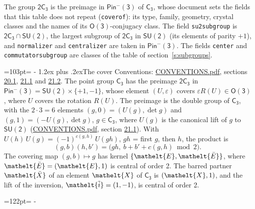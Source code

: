 \documentclass[10pt,a4paper]{article}
\makeatletter
\renewcommand\section{\@startsection{section}{1}{\z@}{-3ex plus -1ex minus -.2ex}%
  {1.2ex plus .2ex}{\normalfont\large\sffamily\bfseries\color{parttitle}}}
\newcommand{\needspace}[1]{\par\penalty-100\begingroup\dimen0=#1\relax\dimen2=\pagegoal
  \advance\dimen2-\pagetotal\ifdim\dimen0>\dimen2\relax\ifdim\dimen2>0pt\vfil\break\fi\fi
  \endgroup}
\numberwithin{equation}{section}
\newcommand{\eltfont}[1]{{\let\sigma\eltsigma\mathelt{#1}}}
\newcommand{\grp}[1]{\mathsf{#1}}
\newcommand{\elt}[1]{\eltfont{#1}}
\newcommand{\dirprod}{\times}
\newcommand{\barred}[1]{\bar{#1}}
\newcommand{\lift}[1]{\tilde{#1}}
\makeatother
\begin{document}
\leavevmode\label{n:element.inversion}\label{n:group.preimage}The group $\grp{2C_{3}}$ is the preimage in $\grp{Pin^{-}(3)}$ of \href{../../../rotation/data/pdf/C3.pdf}{$\grp{C_{3}}$}, whose document sets the fields that this table does not repeat (\texttt{coverof}): its type, family, geometry, crystal classes and the names of its \href{../../../rotation/data/pdf/O3.pdf}{$\grp{O(3)}$}-conjugacy class. The field \texttt{su2subgroup} is $\grp{2C_{3}} \cap \grp{SU(2)}$, the largest subgroup of $\grp{2C_{3}}$ in $\grp{SU(2)}$ (its elements of parity $+1$), and \texttt{normalizer} and \texttt{centralizer} are taken in $\grp{Pin^{-}(3)}$. The fields \texttt{center} and \texttt{commutatorsubgroup} are classes of the table of section~\ref{s:subgroups}.
\needspace{103pt}
\section{The cover}\label{s:cover}
Conventions: \href{../../CONVENTIONS.pdf}{CONVENTIONS.pdf}, sections \href{../../CONVENTIONS.pdf\#conv.20.1}{20.1}, \href{../../CONVENTIONS.pdf\#conv.21.1}{21.1} and \href{../../CONVENTIONS.pdf\#conv.21.2}{21.2}.
\leavevmode\label{n:group.pin.minus}\label{n:group.su2}\label{n:local.pin.sign}\label{n:matrix.covered}\label{n:matrix.lift.su2}\label{n:index.bar}The point group $\grp{C_{3}}$ has the preimage $\grp{2C_{3}}$ in $\grp{Pin^{-}(3)} = \grp{SU(2)} \dirprod \{+1, -1\}$, whose element $(U, \varepsilon)$ covers $\varepsilon R(U) \in \grp{O(3)}$, where $U$ covers the rotation $R(U)$. The preimage is the double group of $\grp{C_{3}}$, with the $2 \cdot 3 = 6$ elements $(g, 0) = (U(g), \det g)$ and $(g, 1) = (-U(g), \det g)$, $g \in \grp{C_{3}}$, where $U(g)$ is the canonical lift of $g$ to $\grp{SU(2)}$ (\href{../../CONVENTIONS.pdf}{CONVENTIONS.pdf}, section \href{../../CONVENTIONS.pdf\#conv.21.1}{21.1}). \label{n:function.cocycle}With $U(h)\,U(g) = (-1)^{c(g,h)}\,U(gh)$, $gh$ = first $g$, then $h$, the product is
\begin{equation}\label{e:product}(g, b)(h, b') = \bigl(gh,\ b + b' + c(g, h) \bmod 2\bigr).\end{equation}
\leavevmode\label{n:mark.bar}The covering map $(g, b) \mapsto g$ has kernel $\{\elt{E}, \elt{\barred{E}}\}$, where $\elt{\barred{E}} = (\elt{E}, 1)$ is central of order 2. \label{n:element.named}\label{n:mark.lift}The barred partner $\elt{\barred{X}}$ of an element $\elt{X}$ of $\grp{C_{3}}$ is $(\elt{X}, 1)$, and the lift of the inversion, $\elt{\lift{i}} = (1, -1)$, is central of order 2.
\needspace{122pt}
\end{document}
